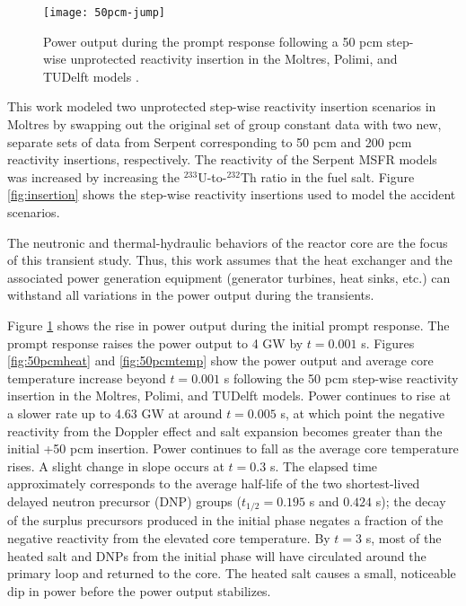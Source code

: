 \begin{figure}[htbp!]
    \centering
    \texttt{[image: 50pcm-jump]}
    \caption{Power output during the prompt response following a 50 pcm
    step-wise unprotected reactivity insertion in the Moltres, Polimi, and
    TUDelft models \cite{fiorina_modelling_2014}.}
    \label{fig:50pcmjump}
\end{figure}

This work modeled two unprotected step-wise reactivity insertion scenarios in
Moltres by swapping out the original set of group constant data with two new,
separate sets of data from Serpent corresponding to 50 pcm and 200 pcm
reactivity insertions, respectively. The reactivity of the Serpent \gls{MSFR}
models was increased by increasing the $^{233}$U-to-$^{232}$Th ratio in
the fuel salt. Figure \ref{fig:insertion} shows the step-wise reactivity
insertions used to model the accident scenarios.

The neutronic and thermal-hydraulic behaviors of the reactor core are the
focus of this transient study. Thus, this work assumes that the heat exchanger
and the associated power generation equipment (generator turbines, heat sinks,
etc.) can withstand all variations in the power output during the transients.

Figure \ref{fig:50pcmjump} shows the rise in power output during
the initial prompt response. The prompt
response raises the power output to 4 GW by $t=0.001$ s.
Figures \ref{fig:50pcmheat} and \ref{fig:50pcmtemp} show the power output and
average core temperature increase beyond $t=0.001$ s following the 50 pcm
step-wise reactivity insertion in the Moltres, Polimi, and TUDelft models.
Power continues to rise at a slower rate up to 4.63 GW at around $t=0.005$ s,
at which point the negative reactivity from the Doppler effect and salt
expansion becomes greater
than the initial +50 pcm insertion. Power continues to fall as the average
core temperature rises. A slight change in slope occurs at $t=0.3$ s. The
elapsed time approximately corresponds to the average half-life of the two
shortest-lived delayed neutron precursor (DNP) groups ($t_{1/2}=0.195$ s and
$0.424$ s); the decay of the surplus precursors produced in the initial phase
negates a fraction of the negative reactivity from the elevated core
temperature. By $t=3$ s, most of the heated salt and \glspl{DNP} from the
initial phase will have circulated around the primary loop and returned to the
core. The heated salt causes a small, noticeable dip in power before the power
output stabilizes.

